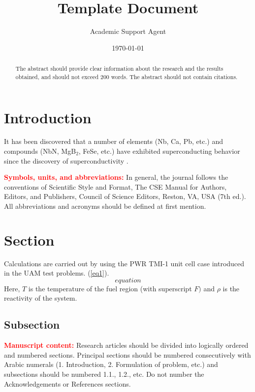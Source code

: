\documentclass{article}
\title{Template Document}
\author{Academic Support Agent}
\date{\today}
\begin{document}
\maketitle

\maketitle


\begin{abstract}The abstract should provide clear information about the research and the results obtained, and should not exceed 200 words. The abstract should not contain citations.

\end{abstract}


\section{Introduction}

It has been discovered that a number of elements (Nb, Ca, Pb, etc.) and 
compounds (NbN, MgB$_{2}$, FeSe, etc.) have exhibited superconducting 
behavior since the discovery of superconductivity \cite{1}.

\textcolor{red}{\textbf{Symbols, units, and abbreviations:}} In general, the journal follows the conventions of Scientific Style and Format, The
CSE Manual for Authors, Editors, and Publishers, Council of Science Editors, Reston, VA, USA (7th ed.). All abbreviations
and acronyms should be defined at first mention.

\section{Section}
Calculations are carried out by using the PWR TMI-1 unit cell case 
introduced in the UAM test problems. (\ref{eq1}).
\begin{equation}
\label{eq1}
equation
\end{equation}
Here, $T$ is the temperature of the fuel region (with superscript $F)$ and $\rho $ 
is the reactivity of the system.

\subsection{Subsection}

\textcolor{red}{\textbf{Manuscript content:}} Research articles should be divided into logically ordered and numbered sections. Principal
sections should be numbered consecutively with Arabic numerals (1. Introduction, 2. Formulation of problem, etc.) and
subsections should be numbered 1.1., 1.2., etc. Do not number the Acknowledgements or References sections.
\end{document}
